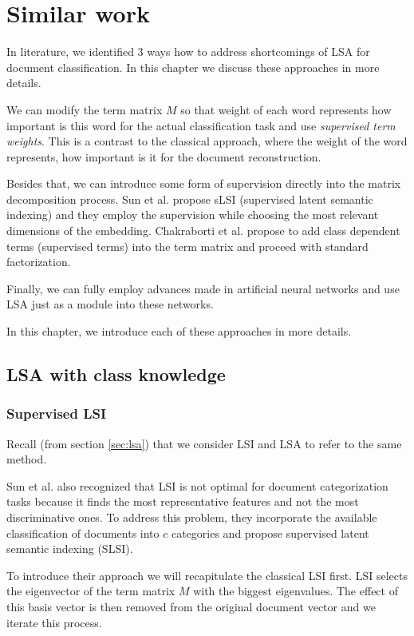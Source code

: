 \chapter{Similar work}
In literature, we identified $3$ ways how to address shortcomings of LSA for document classification. In this chapter we discuss these approaches in more details.

We can modify the term matrix $M$ so that weight of each word represents how important is this word for the actual classification task and use \emph{supervised term weights}. 
This is a contrast to the classical approach, where the weight of the word represents, how important is it for the document reconstruction.

Besides that, we can introduce some form of supervision directly into the matrix decomposition process.
Sun et al. \cite{sun2004supervised} propose sLSI (supervised latent semantic indexing) and they employ the supervision while choosing the most relevant dimensions of the embedding.
Chakraborti et al. \cite{chakraborti2006sprinkling} propose to add class dependent terms (supervised terms) into the term matrix and proceed with standard factorization.

Finally, we can fully employ advances made in artificial neural networks and use LSA just as a module into these networks.

In this chapter, we introduce each of these approaches in more details.


\section{LSA with class knowledge} \label{sec:superwisedlsa}
    \subsection{Supervised LSI}
        Recall (from section \ref{sec:lsa}) that we consider LSI and LSA to refer to the same method. 
    
        Sun et al. \cite{sun2004supervised} %
        also recognized that LSI is not optimal for document categorization tasks because it finds the most representative features and not the most discriminative ones. 
        To address this problem, they incorporate the available classification of documents into $c$ categories and propose supervised latent semantic indexing (SLSI).
        
        To introduce their approach we will recapitulate the classical LSI first. 
        LSI selects the eigenvector of the term matrix $M$ with the biggest eigenvalues.
        The effect of this basis vector is then removed from the original document vector and we iterate this process. 
        
